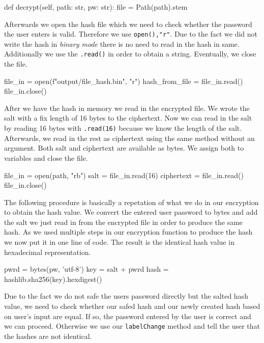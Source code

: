 \documentclass[]{article}
\begin{document}
\begin{python}
def decrypt(self, path: str, pw: str):    
    file = Path(path).stem
\end{python}

Afterwards we open the hash file which we need to check whether the password the user enters is valid. Therefore we 
use \texttt{open(),"r"}. Due to the fact we did not write the hash in \textit{binary mode} there is no need to
read in the hash in same. Additionally we use the \texttt{.read()} in order to obtain a string. Eventually, we close the 
file. 

\begin{python}
file_in = open(f"output/{file}_hash.bin", "r")
hash_from_file = file_in.read()
file_in.close()
\end{python}

After we have the hash in memory we read in the encrypted file. We wrote the salt with a fix length of 16
bytes to the ciphertext. Now we can read in the salt by reading 16 bytes with \texttt{.read(16)} because we know the length
of the salt. Afterwards, we read in the rest as ciphertext using the same method without an argument. 
Both salt and ciphertext are available as bytes. We assign both to variables and close the file.

\begin{python}
file_in = open(path, "rb")
salt = file_in.read(16)
ciphertext = file_in.read() 
file_in.close()
\end{python}

The following procedure is basically a repetation of what we do in our encryption to obtain the hash value. We convert the entered
user password to bytes and add the salt we just read in from the encrypted file in order to produce the same hash.
As we used multiple steps in our encryption function to produce the hash we now put it in one line of code. The result is 
the identical hash value in hexadecimal representation.

\begin{python}
pwrd = bytes(pw, 'utf-8')
key = salt + pwrd
hash = hashlib.sha256(key).hexdigest()
\end{python}

Due to the fact we do not safe the users password directly but the salted hash value, we need to check whether
our safed hash and our newly created hash based on user's input are equal. If so, the password entered by the user is correct and we 
can proceed. Otherwise we use our \texttt{labelChange} method and tell the user that the hashes are not identical.
\end{document}
